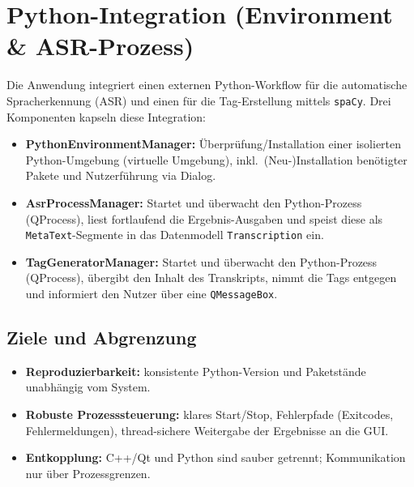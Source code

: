 
\chapter{Python-Integration (Environment \& ASR-Prozess)}
\label{chap:python}


Die Anwendung integriert einen externen Python-Workflow für die automatische Spracherkennung (ASR) und einen für die Tag-Erstellung mittels \texttt{spaCy}. Drei Komponenten kapseln diese Integration:

\begin{itemize}
    \item \textbf{PythonEnvironmentManager:} Überprüfung/Installation einer isolierten Python-Umgebung (virtuelle Umgebung), inkl.\ (Neu-)Installation benötigter Pakete und Nutzerführung via Dialog.

    \item \textbf{AsrProcessManager:} Startet und überwacht den Python-Prozess (QProcess), liest fortlaufend die Ergebnis-Ausgaben und speist diese als \texttt{MetaText}-Segmente in das Datenmodell \texttt{Transcription} ein.

    \item \textbf{TagGeneratorManager:} Startet und überwacht den Python-Prozess (QProcess), übergibt den Inhalt des Transkripts, nimmt die Tags entgegen und informiert den Nutzer über eine \texttt{QMessageBox}.
\end{itemize}


\section{Ziele und Abgrenzung}
\label{sec:py_goals}

\begin{itemize}
    \item \textbf{Reproduzierbarkeit:} konsistente Python-Version und Paketstände unabhängig vom System.

    \item \textbf{Robuste Prozesssteuerung:} klares Start/Stop, Fehlerpfade (Exitcodes, Fehlermeldungen), thread-sichere Weitergabe der Ergebnisse an die GUI.

    \item \textbf{Entkopplung:} C++/Qt und Python sind sauber getrennt; Kommunikation nur über Prozessgrenzen.
\end{itemize}



